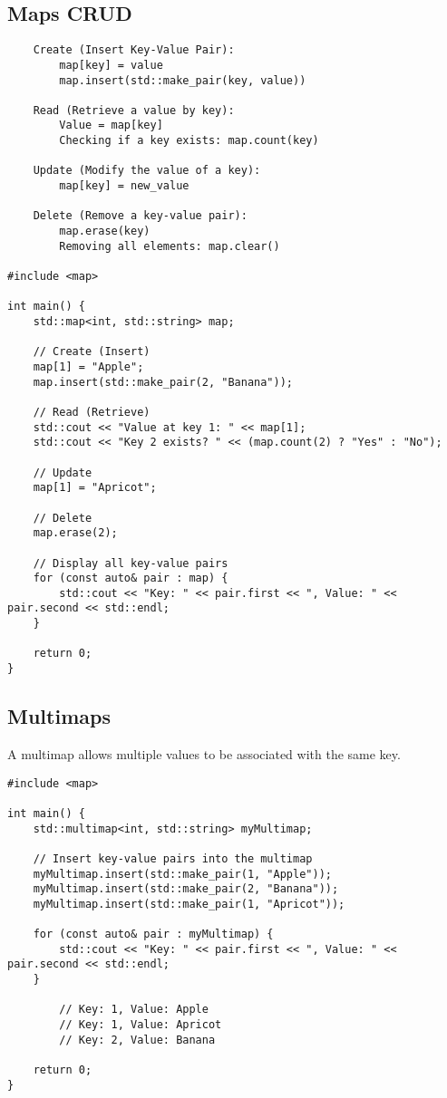 \subsection{Maps CRUD}

\begin{verbatim}
    Create (Insert Key-Value Pair):
        map[key] = value 
        map.insert(std::make_pair(key, value))

    Read (Retrieve a value by key):
        Value = map[key]
        Checking if a key exists: map.count(key)

    Update (Modify the value of a key):
        map[key] = new_value

    Delete (Remove a key-value pair):
        map.erase(key)
        Removing all elements: map.clear()

#include <map>

int main() {
    std::map<int, std::string> map;

    // Create (Insert)
    map[1] = "Apple";
    map.insert(std::make_pair(2, "Banana"));

    // Read (Retrieve)
    std::cout << "Value at key 1: " << map[1];
    std::cout << "Key 2 exists? " << (map.count(2) ? "Yes" : "No");

    // Update
    map[1] = "Apricot";

    // Delete
    map.erase(2);

    // Display all key-value pairs
    for (const auto& pair : map) {
        std::cout << "Key: " << pair.first << ", Value: " << pair.second << std::endl;
    }

    return 0;
}
\end{verbatim}

\subsection{Multimaps}

A multimap allows multiple values to be associated with the same key. 

\begin{verbatim}
#include <map>

int main() {
    std::multimap<int, std::string> myMultimap;

    // Insert key-value pairs into the multimap
    myMultimap.insert(std::make_pair(1, "Apple"));
    myMultimap.insert(std::make_pair(2, "Banana"));
    myMultimap.insert(std::make_pair(1, "Apricot"));

    for (const auto& pair : myMultimap) {
        std::cout << "Key: " << pair.first << ", Value: " << pair.second << std::endl;
    }

        // Key: 1, Value: Apple
        // Key: 1, Value: Apricot
        // Key: 2, Value: Banana

    return 0;
}
\end{verbatim}

